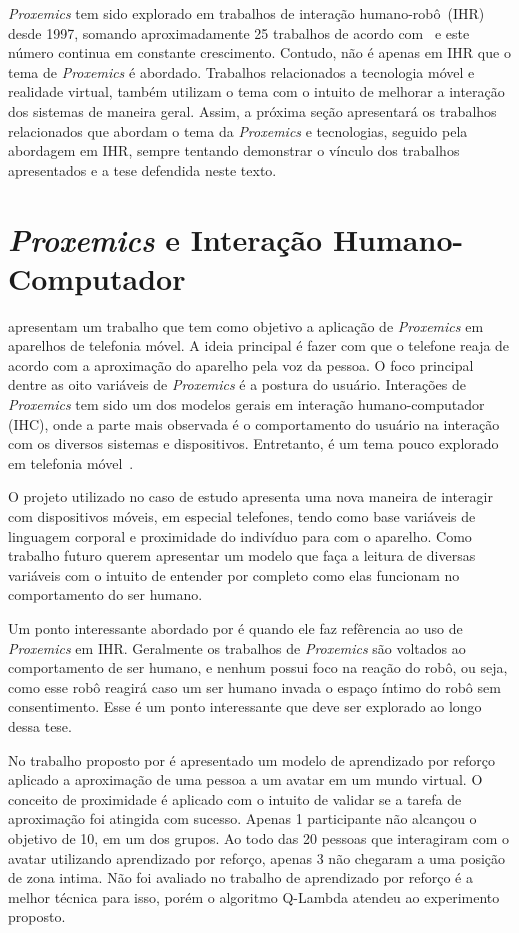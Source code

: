\emph{Proxemics} tem sido explorado em trabalhos de interação humano-robô~(IHR) desde 1997, somando aproximadamente 25 trabalhos de acordo com~ e este número continua em constante crescimento. Contudo, não é apenas em IHR que o tema de \emph{Proxemics} é abordado. Trabalhos relacionados a tecnologia móvel e realidade virtual, também utilizam o tema com o intuito de melhorar a interação dos sistemas de maneira geral. Assim, a próxima seção apresentará os trabalhos relacionados que abordam o tema da \emph{Proxemics} e tecnologias, seguido pela abordagem em IHR, sempre tentando demonstrar o vínculo dos trabalhos apresentados e a tese defendida neste texto.

\section{\emph{Proxemics} e Interação Humano-Computador}
\label{sec:proxemicstec}
 apresentam um trabalho que tem como objetivo a aplicação de \emph{Proxemics} em aparelhos de telefonia móvel. A ideia principal é fazer com que o telefone reaja de acordo com a aproximação do aparelho pela voz da pessoa. O foco principal dentre as oito variáveis de \emph{Proxemics} é a postura do usuário. Interações de \emph{Proxemics} tem sido um dos modelos gerais em interação humano-computador (IHC), onde a parte mais observada é o comportamento do usuário na interação com os diversos sistemas e dispositivos. Entretanto, é um tema pouco explorado em telefonia móvel~\cite{hemmert:2013}.

O projeto utilizado no caso de estudo apresenta uma nova maneira de interagir com dispositivos móveis, em especial telefones, tendo como base variáveis de linguagem corporal e proximidade do indivíduo para com o aparelho. Como trabalho futuro  querem apresentar um modelo que faça a leitura de diversas variáveis com o intuito de entender por completo como elas funcionam no comportamento do ser humano.

Um ponto interessante abordado por  é quando ele faz refêrencia ao uso de \emph{Proxemics} em IHR. Geralmente os trabalhos de \emph{Proxemics} são voltados ao comportamento de ser humano, e nenhum possui foco na reação do robô, ou seja, como esse robô reagirá caso um ser humano invada o espaço íntimo do robô sem consentimento. Esse é um ponto interessante que deve ser explorado ao longo dessa tese.

No trabalho proposto por  é apresentado um modelo de aprendizado por reforço aplicado a aproximação de uma pessoa a um avatar em um mundo virtual. O conceito de proximidade é aplicado com o intuito de validar se a tarefa de aproximação foi atingida com sucesso. Apenas 1 participante não alcançou o objetivo de 10, em um dos grupos. Ao todo das 20 pessoas que interagiram com o avatar utilizando aprendizado por reforço, apenas 3 não chegaram a uma posição de zona intima. Não foi avaliado no trabalho de aprendizado por reforço é a melhor técnica para isso, porém o algoritmo Q-Lambda atendeu ao experimento proposto.

